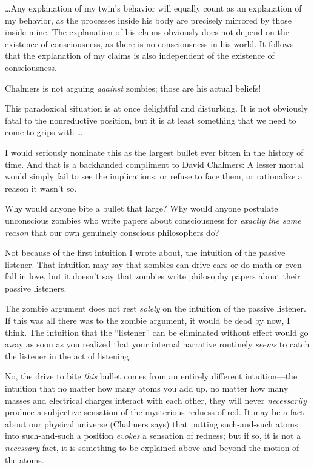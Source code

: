 {
 \ldots Any explanation of my twin's behavior will
equally count as an explanation of my behavior, as the processes inside
his body are precisely mirrored by those inside mine. The explanation
of his claims obviously does not depend on the existence of
consciousness, as there is no consciousness in his world. It follows
that the explanation of my claims is also independent of the existence
of consciousness.}

{
 Chalmers is not arguing \textit{against} zombies; those are his
actual beliefs!}

{
 This paradoxical situation is at once delightful and disturbing.
It is not obviously fatal to the nonreductive position, but it is at
least something that we need to come to grips with \ldots}

{
 I would seriously nominate this as the largest bullet ever bitten
in the history of time. And that is a backhanded compliment to David
Chalmers: A lesser mortal would simply fail to see the implications, or
refuse to face them, or rationalize a reason it wasn't
so.}

{
 Why would anyone bite a bullet that large? Why would anyone
postulate unconscious zombies who write papers about consciousness for
\textit{exactly the same reason} that our own genuinely conscious
philosophers do?}

{
 Not because of the first intuition I wrote about, the intuition of
the passive listener. That intuition may say that zombies can drive
cars or do math or even fall in love, but it doesn't
say that zombies write philosophy papers about their passive
listeners.}

{
 The zombie argument does not rest \textit{solely} on the intuition
of the passive listener. If this was all there was to the zombie
argument, it would be dead by now, I think. The intuition that the
``listener'' can be eliminated
without effect would go away as soon as you realized that your internal
narrative routinely \textit{seems} to catch the listener in the act of
listening.}

{
 No, the drive to bite \textit{this} bullet comes from an entirely
different intuition---the intuition that no matter how many atoms you
add up, no matter how many masses and electrical charges interact with
each other, they will never \textit{necessarily} produce a subjective
sensation of the mysterious redness of red. It may be a fact about our
physical universe (Chalmers says) that putting such-and-such atoms into
such-and-such a position \textit{evokes} a sensation of redness; but if
so, it is not a \textit{necessary} fact, it is something to be
explained above and beyond the motion of the atoms.}

